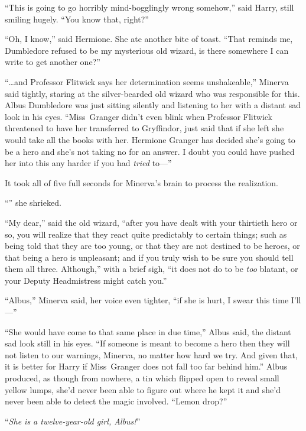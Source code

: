 “This is going to go horribly mind-bogglingly wrong somehow,” said Harry, still smiling hugely.
“You know that, right?”

“Oh, I know,” said Hermione. She ate another bite of toast.
“That reminds me, Dumbledore refused to be my mysterious old wizard, is there somewhere I can write to get another one?”


“…and Professor Flitwick says her determination seems unshakeable,” Minerva said tightly, staring at the silver-bearded old wizard who was responsible for this. Albus Dumbledore was just sitting silently and listening to her with a distant sad look in his eyes.
“Miss~Granger didn’t even blink when Professor Flitwick threatened to have her transferred to Gryffindor, just said that if she left she would take all the books with her. Hermione Granger has decided she’s going to be a hero and she’s not taking no for an answer. I doubt you could have pushed her into this any harder if you had \emph{tried} to—”

It took all of five full seconds for Minerva’s brain to process the realization.

“” she shrieked.

“My dear,” said the old wizard, “after you have dealt with your thirtieth hero or so, you will realize that they react quite predictably to certain things; such as being told that they are too young, or that they are not destined to be heroes, or that being a hero is unpleasant; and if you truly wish to be sure you should tell them all three. Although,” with a brief sigh, “it does not do to be \emph{too} blatant, or your Deputy Headmistress might catch you.”

“Albus,” Minerva said, her voice even tighter, “if she is hurt, I swear this time I’ll—”

“She would have come to that same place in due time,” Albus said, the distant sad look still in his eyes.
“If someone is meant to become a hero then they will not listen to our warnings, Minerva, no matter how hard we try. And given that, it is better for Harry if Miss~Granger does not fall too far behind him.” Albus produced, as though from nowhere, a tin which flipped open to reveal small yellow lumps, she’d never been able to figure out where he kept it and she’d never been able to detect the magic involved.
“Lemon drop?”

“\emph{She is a twelve-year-old girl, Albus!}”


